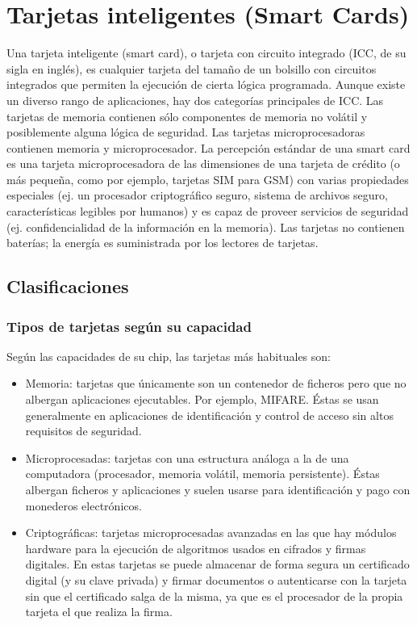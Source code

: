 \chapter{Tarjetas inteligentes (Smart Cards)}

Una tarjeta inteligente (smart card), o tarjeta con circuito integrado (ICC, de su sigla en inglés), es cualquier tarjeta del tamaño de un bolsillo con circuitos integrados que permiten la ejecución de cierta lógica programada. 
Aunque existe un diverso rango de aplicaciones, hay dos categorías principales de ICC. Las tarjetas de memoria contienen sólo componentes de memoria no volátil y posiblemente alguna lógica de seguridad. Las tarjetas microprocesadoras contienen memoria y microprocesador.
La percepción estándar de una smart card es una tarjeta microprocesadora de las dimensiones de una tarjeta de crédito (o más pequeña, como por ejemplo, tarjetas SIM para GSM) con varias propiedades especiales (ej. un procesador criptográfico seguro, sistema de archivos seguro, características legibles por humanos) y es capaz de proveer servicios de seguridad (ej.     confidencialidad de la información en la memoria).
Las tarjetas no contienen baterías; la energía es suministrada por los lectores de tarjetas.

\section{Clasificaciones}

\subsection{Tipos de tarjetas según su capacidad}

\bigskip
Según las capacidades de su chip, las tarjetas más habituales son:

\begin{itemize}
\item Memoria: tarjetas que únicamente son un contenedor de ficheros pero que no albergan aplicaciones ejecutables. Por ejemplo, MIFARE. Éstas se usan generalmente en aplicaciones de identificación y control de acceso sin altos requisitos de seguridad. 
\item Microprocesadas: tarjetas con una estructura análoga a la de una computadora (procesador, memoria volátil, memoria persistente). Éstas albergan ficheros y aplicaciones y suelen usarse para identificación y pago con monederos electrónicos. 
\item Criptográficas: tarjetas microprocesadas avanzadas en las que hay módulos hardware para la ejecución de algoritmos usados en cifrados y firmas digitales. En estas tarjetas se puede almacenar de forma segura un certificado digital (y su clave privada) y firmar documentos o autenticarse con la tarjeta sin que el certificado salga de la misma, ya que es el procesador de la propia tarjeta el que realiza la firma.
\end{itemize}



